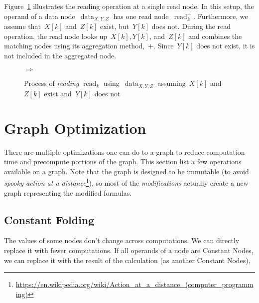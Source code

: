\documentclass{article}
\DeclareMathOperator{\readNode}{read}
\DeclareMathOperator{\dataNode}{data}
\begin{document}
Figure~\ref{fig:modification:reading} illustrates the reading operation at a single read node.
In this setup, the operand of a data node~$\dataNode_{X,Y,Z}$ has one read node~$\readNode_k^+$.
Furthermore, we assume that~$X[k]$ and~$Z[k]$ exist, but~$Y[k]$ does not.
During the read operation, the read node looks up~$X[k], Y[k]$, and~$Z[k]$ and combines the matching nodes using its aggregation method,~$+$.
Since~$Y[k]$ does not exist, it is not included in the aggregated node.
%
\begin{figure}
  \centering
  \quad$\Rightarrow$\quad
  \caption{Process of \emph{reading} $\readNode_k$ using~$\dataNode_{X, Y, Z}$ assuming~$X[k]$ and~$Z[k]$ exist and~$Y[k]$ does not}
  \label{fig:modification:reading}
\end{figure}

\section{Graph Optimization}

There are multiple optimizations one can do to a graph to reduce computation time and precompute portions of the graph.
This section list a few operations available on a graph.
Note that the graph is designed to be immutable (to avoid \emph{spooky action at a distance}\footnote{
  \url{https://en.wikipedia.org/wiki/Action_at_a_distance_(computer_programming)}
}), so most of the \emph{modifications} actually create a new graph representing the modified formulas.

\subsection{Constant Folding}

The values of some nodes don't change across computations.
We can directly replace it with fewer computations.
If all operands of a node are Constant Nodes, we can replace it with the result of the calculation (as another Constant Nodes),
\end{document}

